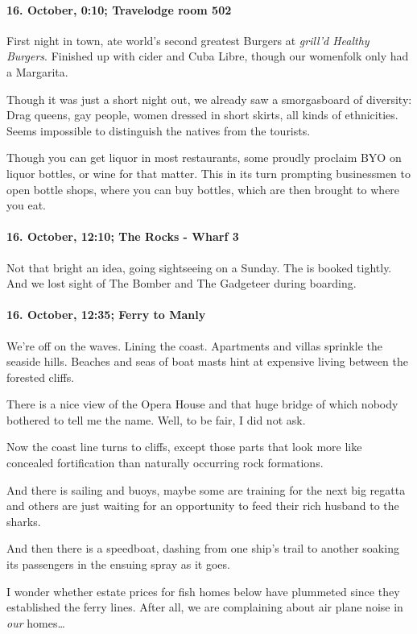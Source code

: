 \paragraph{16. October, 0:10; Travelodge room 502}
First night in town, ate world's second greatest Burgers at \emph{grill'd Healthy Burgers}.
Finished up with cider and Cuba Libre, though our womenfolk only had a Margarita.

Though it was just a short night out, we already saw a smorgasboard of diversity:
Drag queens, gay people, women dressed in short skirts, all kinds of ethnicities.
Seems impossible to distinguish the natives from the tourists.

Though you can get liquor in most restaurants, some proudly proclaim BYO on liquor bottles, or wine for that matter.
This in its turn prompting businessmen to open bottle shops, where you can buy bottles, which are then brought to where you eat.

\paragraph{16. October, 12:10; The Rocks - Wharf 3}
Not that bright an idea, going sightseeing on a Sunday.
The is booked tightly.
And we lost sight of The Bomber and The Gadgeteer during boarding.

\paragraph{16. October, 12:35; Ferry to Manly}
We're off on the waves.
Lining the coast.
Apartments and villas sprinkle the seaside hills.
Beaches and seas of boat masts hint at expensive living between the forested cliffs.

There is a nice view of the Opera House and that huge bridge of which nobody bothered to tell me the name.
Well, to be fair, I did not ask.

Now the coast line turns to cliffs, except those parts that look more like concealed fortification than naturally occurring rock formations.

And there is sailing and buoys, maybe some are training for the next big regatta and others are just waiting for an opportunity to feed their rich husband to the sharks.

And then there is a speedboat, dashing from one ship's trail to another soaking its passengers in the ensuing spray as it goes.

I wonder whether estate prices for fish homes below have plummeted since they established the ferry lines.
After all, we are complaining about air plane noise in \emph{our} homes\ldots{}

